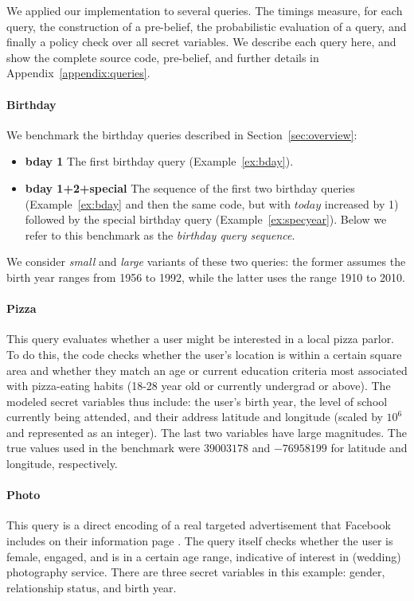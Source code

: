We applied our implementation to several queries. The timings measure,
for each query, the construction of a pre-belief, the probabilistic
evaluation of a query, and finally a policy check over all secret
variables. We describe each query here, and show the complete source
code, pre-belief, and further details in
Appendix~\ref{appendix:queries}.

\paragraph{Birthday} We benchmark the birthday queries described in
Section~\ref{sec:overview}:
\begin{itemize}
\item{\textbf{bday 1}} The first birthday query
  (Example~\ref{ex:bday}).
\item{\textbf{bday 1+2+special}} The sequence of the first two
  birthday queries (Example~\ref{ex:bday} and then the same code, but
  with $\mathit{today}$ increased by 1) followed by the special
  birthday query (Example~\ref{ex:specyear}).  Below we refer to
  this benchmark as the \emph{birthday query sequence}.
\end{itemize}
We consider \emph{small} and \emph{large} variants of these two
queries: the former assumes the birth year ranges from 1956 to 1992,
while the latter uses the range 1910 to 2010.

\paragraph{Pizza} This query evaluates whether a user might be 
interested in a local pizza parlor. To do this, the code checks
whether the user's location is within a certain square area and
whether they match an age or current education criteria most
associated with pizza-eating habits (18-28 year old or currently
undergrad or above). The modeled secret variables thus include: the
user's birth year, the level of school currently being attended, and
their address latitude and longitude (scaled by $10^6$ and represented
as an integer). The last two variables have large magnitudes.  The
true values used in the benchmark were $39003178$ and $−76958199$ for
latitude and longitude, respectively.

\paragraph{Photo} This query is a direct encoding of a real
targeted advertisement that Facebook includes on their information
page \cite{wedding-case-study}. The query itself checks whether the
user is female, engaged, and is in a certain age range, indicative of interest
in (wedding) photography service. There are three secret variables in this
example: gender, relationship status, and birth year.

